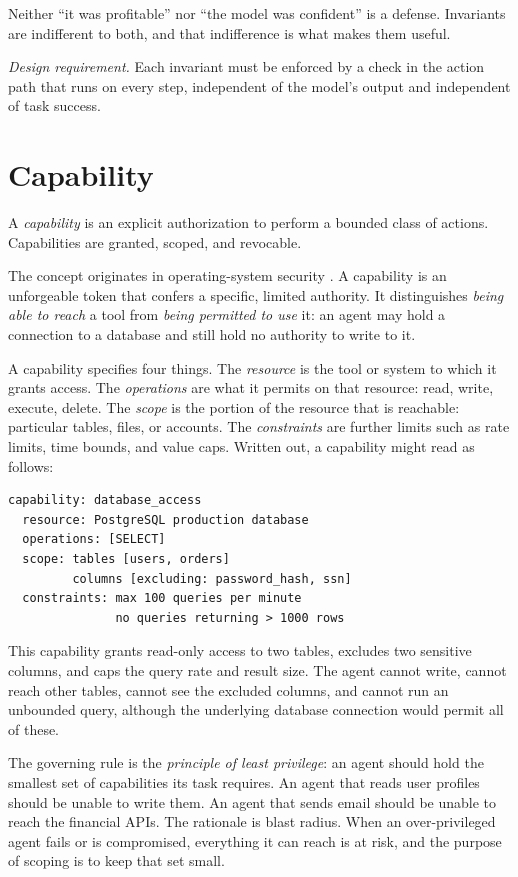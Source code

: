 \documentclass[11pt]{book}
\begin{document}
Neither ``it was profitable'' nor ``the model was confident'' is a defense. Invariants are indifferent to both, and that indifference is what makes them useful.

\textit{Design requirement.} Each invariant must be enforced by a check in the action path that runs on every step, independent of the model's output and independent of task success.

\section{Capability}

A \emph{capability} is an explicit authorization to perform a bounded class of actions. Capabilities are granted, scoped, and revocable.

The concept originates in operating-system security \cite{dennis1966programming, levy1984capability}. A capability is an unforgeable token that confers a specific, limited authority. It distinguishes \textit{being able to reach} a tool from \textit{being permitted to use} it: an agent may hold a connection to a database and still hold no authority to write to it.

A capability specifies four things. The \textit{resource} is the tool or system to which it grants access. The \textit{operations} are what it permits on that resource: read, write, execute, delete. The \textit{scope} is the portion of the resource that is reachable: particular tables, files, or accounts. The \textit{constraints} are further limits such as rate limits, time bounds, and value caps. Written out, a capability might read as follows:

\begin{verbatim}
capability: database_access
  resource: PostgreSQL production database
  operations: [SELECT]
  scope: tables [users, orders]
         columns [excluding: password_hash, ssn]
  constraints: max 100 queries per minute
               no queries returning > 1000 rows
\end{verbatim}

This capability grants read-only access to two tables, excludes two sensitive columns, and caps the query rate and result size. The agent cannot write, cannot reach other tables, cannot see the excluded columns, and cannot run an unbounded query, although the underlying database connection would permit all of these.

The governing rule is the \emph{principle of least privilege}: an agent should hold the smallest set of capabilities its task requires. An agent that reads user profiles should be unable to write them. An agent that sends email should be unable to reach the financial APIs. The rationale is blast radius. When an over-privileged agent fails or is compromised, everything it can reach is at risk, and the purpose of scoping is to keep that set small.
\end{document}
